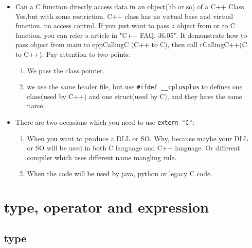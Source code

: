 \documentclass[a4paper,11pt,twoside]{book}
\begin{document}
\begin{itemize}
	
	
	\item Can a C function directly access data in an object(lib or so) of a C++ Class. Yes,but with some restriction. C++ class has no virtual base and virtual function. no access control. If you just want to pass a object from or to C function, you can refer a article in "C++ FAQ, 36.05". It demonstrate how to pass object from main to cppCallingC (C++ to C), then call cCallingC++(C to C++). Pay attention to two points:
	\begin{enumerate}
		\item We pass the class pointer.
		\item we use the same header file, but use \texttt{\#ifdef \_\_cplusplus} to defines one class(used by C++) and one struct(used by C), and they have the same name.
	\end{enumerate}
	
	\item There are two occasions which you need to use \texttt{extern "C"}:
	\begin{enumerate}
		\item When you want to produce a DLL or SO. Why, because maybe your DLL or SO will be used in both C language and C++ language. Or different compiler which uses different name mangling rule.
		
		\item When the code will be used by java, python or legacy C code.
	\end{enumerate}
\end{itemize}


\chapter{type, operator and expression}
\section{type}
\end{document}
